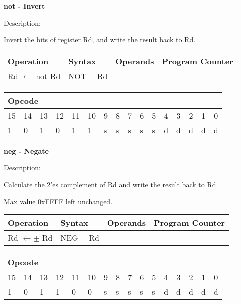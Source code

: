 \documentclass{article}
\begin{document}
\bigskip

\textbf{not - Invert }

Description:

Invert the bits of register Rd, and write the result back to Rd.

\begin{tabular}{|l|l|l|l|}
\hline
Operation & Syntax & Operands & Program Counter \\ \hline
Rd $\leftarrow $ not Rd & NOT \ \ Rd &  &  \\ \hline
\end{tabular}

\begin{tabular}{|c|c|c|c|c|c|c|c|c|c|c|c|c|c|c|c|}
\hline
\multicolumn{6}{|l|}{Opcode} & \multicolumn{5}{|l|}{} & \multicolumn{5}{|l|}{
} \\ \hline
15 & 14 & 13 & 12 & 11 & 10 & 9 & 8 & 7 & 6 & 5 & 4 & 3 & 2 & 1 & 0 \\ \hline
\multicolumn{1}{|l|}{1} & \multicolumn{1}{|l|}{0} & \multicolumn{1}{|l|}{1}
& \multicolumn{1}{|l|}{0} & \multicolumn{1}{|l|}{1} & \multicolumn{1}{|l|}{1}
& \multicolumn{1}{|l|}{s} & \multicolumn{1}{|l|}{s} & \multicolumn{1}{|l|}{s}
& \multicolumn{1}{|l|}{s} & \multicolumn{1}{|l|}{s} & \multicolumn{1}{|l|}{d}
& \multicolumn{1}{|l|}{d} & \multicolumn{1}{|l|}{d} & \multicolumn{1}{|l|}{d}
& \multicolumn{1}{|l|}{d} \\ \hline
\end{tabular}

\bigskip

\textbf{neg - Negate}

Description:

Calculate the 2'es complement of Rd and write the result back to Rd.

Max value 0xFFFF left unchanged.

\begin{tabular}{|l|l|l|l|}
\hline
Operation & Syntax & Operands & Program Counter \\ \hline
Rd $\leftarrow \pm $ Rd & NEG \ \ Rd &  &  \\ \hline
\end{tabular}

\begin{tabular}{|c|c|c|c|c|c|c|c|c|c|c|c|c|c|c|c|}
\hline
\multicolumn{6}{|l|}{Opcode} & \multicolumn{5}{|l|}{} & \multicolumn{5}{|l|}{
} \\ \hline
15 & 14 & 13 & 12 & 11 & 10 & 9 & 8 & 7 & 6 & 5 & 4 & 3 & 2 & 1 & 0 \\ \hline
\multicolumn{1}{|l|}{1} & \multicolumn{1}{|l|}{0} & \multicolumn{1}{|l|}{1}
& \multicolumn{1}{|l|}{1} & \multicolumn{1}{|l|}{0} & \multicolumn{1}{|l|}{0}
& \multicolumn{1}{|l|}{s} & \multicolumn{1}{|l|}{s} & \multicolumn{1}{|l|}{s}
& \multicolumn{1}{|l|}{s} & \multicolumn{1}{|l|}{s} & \multicolumn{1}{|l|}{d}
& \multicolumn{1}{|l|}{d} & \multicolumn{1}{|l|}{d} & \multicolumn{1}{|l|}{d}
& \multicolumn{1}{|l|}{d} \\ \hline
\end{tabular}
\end{document}
